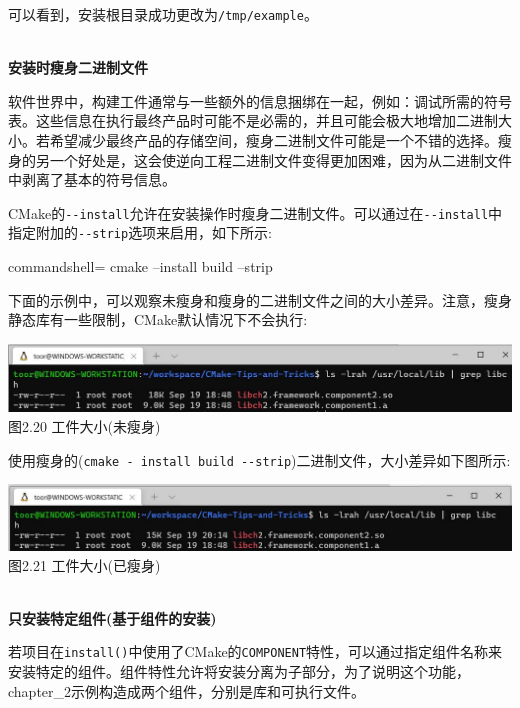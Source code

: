 可以看到，安装根目录成功更改为\texttt{/tmp/example}。

\hspace*{\fill} \\ %
\noindent
\textbf{安装时瘦身二进制文件}

软件世界中，构建工件通常与一些额外的信息捆绑在一起，例如：调试所需的符号表。这些信息在执行最终产品时可能不是必需的，并且可能会极大地增加二进制大小。若希望减少最终产品的存储空间，瘦身二进制文件可能是一个不错的选择。瘦身的另一个好处是，这会使逆向工程二进制文件变得更加困难，因为从二进制文件中剥离了基本的符号信息。

CMake的\texttt{-{}-install}允许在安装操作时瘦身二进制文件。可以通过在\texttt{-{}-install}中指定附加的\texttt{-{}-strip}选项来启用，如下所示:

\begin{tcblisting}{commandshell={}}
cmake --install build --strip
\end{tcblisting}

下面的示例中，可以观察未瘦身和瘦身的二进制文件之间的大小差异。注意，瘦身静态库有一些限制，CMake默认情况下不会执行:

\begin{center}
\includegraphics[width=1.\textwidth]{content/1/chapter2/images/20.jpg}\\
图2.20 工件大小(未瘦身)
\end{center}

使用瘦身的(\texttt{cmake - install build -{}-strip})二进制文件，大小差异如下图所示:

\begin{center}
\includegraphics[width=1.\textwidth]{content/1/chapter2/images/21.jpg}\\
图2.21 工件大小(已瘦身)
\end{center}

\hspace*{\fill} \\ %
\noindent
\textbf{只安装特定组件(基于组件的安装)}

若项目在\texttt{install()}中使用了CMake的\texttt{COMPONENT}特性，可以通过指定组件名称来安装特定的组件。组件特性允许将安装分离为子部分，为了说明这个功能，chapter\_2示例构造成两个组件，分别是库和可执行文件。

